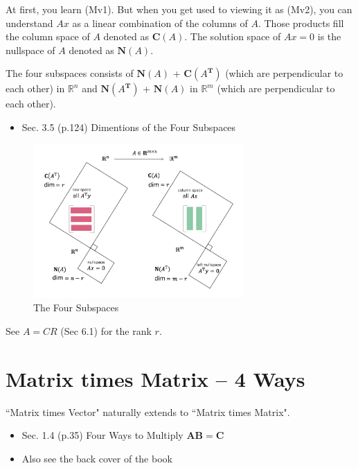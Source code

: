 \documentclass[letterpaper]{article}
\begin{document}
At first, you learn (Mv1). But when you get used to viewing it as (Mv2),
you can understand $Ax$ as a linear combination of the columns of $A$.
Those products fill the column space of $A$  denoted as $\mathbf{C}(A)$.
The solution space of $Ax=0$ is the nullspace of $A$ denoted as $\mathbf{N}(A)$.

The four subspaces consists of $\mathbf{N}(A)$ + $\mathbf{C}(A^\mathbf{T})$ 
(which are perpendicular to each other) in $\mathbb{R}^n$ and
$\mathbf{N}(A^\mathbf{T})$ + $\mathbf{N}(A)$ in $\mathbb{R}^m$
(which are perpendicular to each other).

\begin{itemize}
  \item Sec. 3.5 (p.124) Dimentions of the Four Subspaces
\end{itemize} 

\begin{figure}[H]
  \centering
  \includegraphics[keepaspectratio, width=8cm]{4-Subspaces.png}
  \caption{The Four Subspaces}
\end{figure}

See $A=CR$ (Sec 6.1) for the rank $r$.


\clearpage

\section{Matrix times Matrix -- 4 Ways}

``Matrix times Vector" naturally extends to ``Matrix times Matrix".

\begin{itemize}
  \item Sec. 1.4 (p.35) Four Ways to Multiply $\bm{AB=C}$
  \item Also see the back cover of the book
\end{itemize} 
\end{document}
